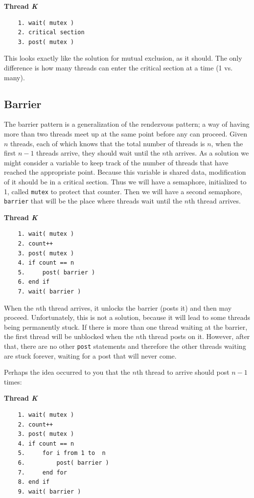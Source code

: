 \documentclass[a4paper]{report}
\begin{document}
\textbf{Thread \textit{K}}\vspace{-2em}
\begin{verbatim}
	1. wait( mutex )
	2. critical section
	3. post( mutex )
  \end{verbatim}
\vspace{-2em}

This looks exactly like the solution for mutual exclusion, as it should. The only difference is how many threads can enter the critical section at a time (1 vs. many).


\subsection*{Barrier}
The barrier pattern is a generalization of the rendezvous pattern; a way of having more than two threads meet up at the same point before any can proceed. Given $n$ threads, each of which knows that the total number of threads is $n$, when the first $n-1$ threads arrive, they should wait until the $n$th arrives. As a solution we might consider a variable to keep track of the number of threads that have reached the appropriate point. Because this variable is shared data, modification of it should be in a critical section.  Thus we will have a semaphore, initialized to 1, called \texttt{mutex} to protect that counter. Then we will have a second semaphore, \texttt{barrier} that will be the place where threads wait until the $n$th thread arrives.


\textbf{Thread \textit{K}}\vspace{-2em}
\begin{verbatim}
	1. wait( mutex )
	2. count++
	3. post( mutex )
	4. if count == n
	5.     post( barrier )
	6. end if
	7. wait( barrier )
  \end{verbatim}
\vspace{-2em}

When the $n$th thread arrives, it unlocks the barrier (posts it) and then may proceed. Unfortunately, this is not a solution, because it will lead to some threads being permanently stuck. If there is more than one thread waiting at the barrier, the first thread will be unblocked when the $n$th thread posts on it. However, after that, there are no other \texttt{post} statements and therefore the other threads waiting are stuck forever, waiting for a post that will never come.

Perhaps the idea occurred to you that the $n$th thread to arrive should post $n-1$ times:

\textbf{Thread \textit{K}}\vspace{-2em}
\begin{verbatim}
	1. wait( mutex )
	2. count++
	3. post( mutex )
	4. if count == n
	5.     for i from 1 to  n
	6.         post( barrier )
	7.     end for
	8. end if
	9. wait( barrier )
  \end{verbatim}
\vspace{-2em}
\end{document}
